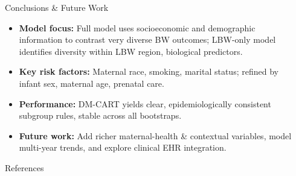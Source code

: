\documentclass[final]{beamer}
\newlength{\sepwidth}
\newlength{\colwidth}
\newcommand{\tightlist}{\setlength\itemsep{0.2em}\setlength\topsep{0em}\setlength\parsep{0em}}
\newcommand{\separatorcolumn}{\begin{column}{\sepwidth}\end{column}}
\begin{document}
\begin{frame}[t]
\begin{columns}[t]
\begin{column}{\colwidth}
\begin{block}
  
\end{block}


\begin{alertblock}{Conclusions \& Future Work}          \vspace{-.4em}
    \small
    \begin{itemize}\tightlist
        \item \textbf{Model focus:} Full model uses socioeconomic and demographic information to contrast very diverse BW outcomes; LBW-only model identifies diversity within LBW region, biological predictors.
        \item \textbf{Key risk factors:} Maternal race, smoking, marital status; refined by infant sex, maternal age, prenatal care.
        \item \textbf{Performance:} DM-CART yields clear, epidemiologically consistent subgroup rules, stable across all bootstraps.
        \item\textbf{Future work:} Add richer maternal-health \& contextual variables, model multi-year trends, and explore clinical EHR integration.
    \end{itemize}
\end{alertblock}

\vspace{-1em}
\begin{block}{References}

    \tiny 
    \setlength{\bibsep}{0pt plus 0.3ex}
    
    
  \end{block}

\end{column}

\separatorcolumn
\end{columns}
\end{frame}
\end{document}
